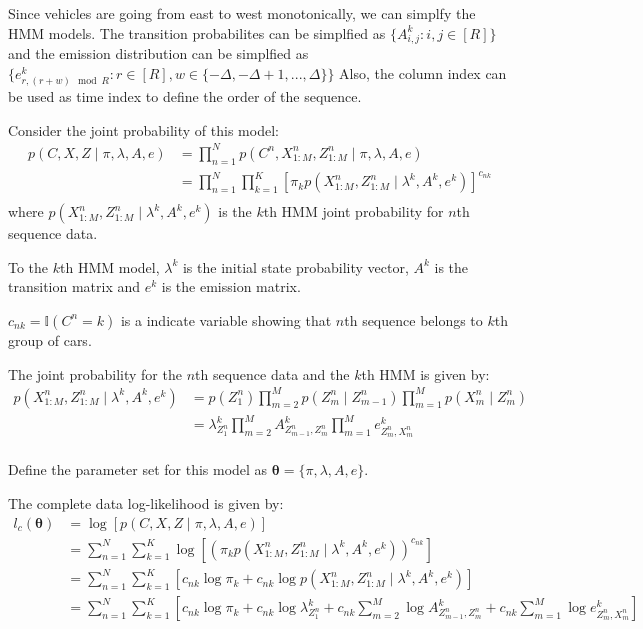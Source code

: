 \documentclass[12pt]{article}
\newenvironment{problem}[2][Problem]{\begin{trivlist}
\item[\hskip \labelsep {\bfseries #1}\hskip \labelsep {\bfseries #2.}]}{\end{trivlist}}
\begin{document}
\begin{problem}{2.7.21}
Since vehicles are going from east to west monotonically, we can simplfy the
HMM models. The transition probabilites can be simplfied as 
$\{A^{k}_{i,j}: i, j \in [R]\}$ and the emission distribution can be simplfied as
$\{e^{k}_{r,(r+w)\mod R}: r \in [R], w \in \{-\Delta, -\Delta+1, ..., \Delta\}\}$
Also, the column index can be used as time index to define the order of the sequence.

Consider the joint probability of this model:
\begin{align*}
    p(C, X, Z \mid \pi, \lambda, A, e) 
    &= \prod_{n=1}^{N} p(C^{n}, X^n_{1:M}, Z^n_{1:M} \mid \pi, \lambda, A, e) \\
    &= \prod_{n=1}^{N} \prod_{k=1}^{K} [\pi_k p(X^n_{1:M}, Z^n_{1:M}\mid \lambda^k, A^{k}, e^{k})]^{c_{nk}} \\
\end{align*}
where $p(X^n_{1:M}, Z^n_{1:M}\mid \lambda^k, A^{k}, e^{k})$ is the $k$th HMM joint probability
for $n$th sequence data.


To the $k$th HMM model, $\lambda^k$ is the initial state probability vector,
$A^k$ is the transition matrix and $e^k$ is the emission matrix.

$c_{nk} = \mathbb{I}(C^n = k)$ is a indicate variable showing that $n$th sequence
belongs to $k$th group of cars.

The joint probability for the $n$th sequence data and the $k$th HMM is given by:
\begin{align*}
    p(X^n_{1:M}, Z^n_{1:M}\mid \lambda^k, A^{k}, e^{k})
    &= p(Z^n_1)\prod_{m=2}^{M}p(Z^n_m\mid Z^n_{m-1})\prod_{m=1}^{M}p(X^{n}_m\mid Z^n_m) \\
    &= \lambda^k_{Z^n_1}\prod_{m=2}^{M}A^k_{Z^n_{m-1},Z^n_m}\prod_{m=1}^{M}e^k_{Z^n_{m},X^n_m}\\
\end{align*}

Define the parameter set for this model as $\bm{\theta} = \{ \pi, \lambda, A, e\}$.

The complete data log-likelihood is given by:
\begin{align*}
    l_c(\bm{\theta}) &= \log [p(C, X, Z \mid \pi, \lambda, A, e)] \\
    &= \sum_{n=1}^{N} \sum_{k=1}^{K} 
        \log [(\pi_k p(X^n_{1:M}, Z^n_{1:M}\mid \lambda^k, A^{k}, e^{k}))^{c_{nk}}] \\
    &= \sum_{n=1}^{N} \sum_{k=1}^{K} 
        [c_{nk}\log \pi_k + c_{nk}\log p(X^n_{1:M}, Z^n_{1:M}\mid \lambda^k, A^{k}, e^{k})]  \\
    &= \sum_{n=1}^{N} \sum_{k=1}^{K}
        [c_{nk}\log \pi_k 
        + c_{nk} \log \lambda^k_{Z^n_1}
        + c_{nk} \sum_{m=2}^{M} \log A^k_{Z^n_{m-1},Z^n_m}
        + c_{nk} \sum_{m=1}^{M} \log e^k_{Z^n_{m},X^n_m}
        ]  \\
\end{align*}


\end{problem}
\end{document}
